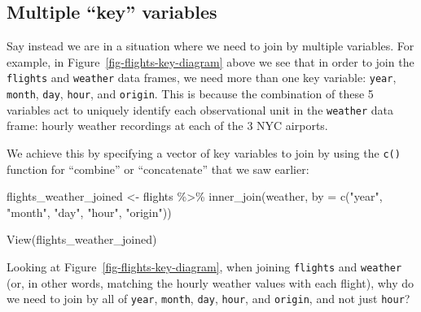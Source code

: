 \documentclass[
  letterpaper,
  DIV=11,
  numbers=noendperiod]{scrreprt}
\newenvironment{Shaded}{\begin{snugshade}}{\end{snugshade}}
\newcommand{\AttributeTok}[1]{\textcolor[rgb]{0.40,0.45,0.13}{#1}}
\newcommand{\FunctionTok}[1]{\textcolor[rgb]{0.28,0.35,0.67}{#1}}
\newcommand{\NormalTok}[1]{\textcolor[rgb]{0.00,0.23,0.31}{#1}}
\newcommand{\OtherTok}[1]{\textcolor[rgb]{0.00,0.23,0.31}{#1}}
\newcommand{\SpecialCharTok}[1]{\textcolor[rgb]{0.37,0.37,0.37}{#1}}
\newcommand{\StringTok}[1]{\textcolor[rgb]{0.13,0.47,0.30}{#1}}
\theoremstyle{definition}
\theoremstyle{remark}
\begin{document}
\hypertarget{multiple-key-variables}{%
\subsection{Multiple ``key'' variables}\label{multiple-key-variables}}

Say instead we are in a situation where we need to join by multiple
variables. For example, in Figure~\ref{fig-flights-key-diagram} above we
see that in order to join the \texttt{flights} and \texttt{weather} data
frames, we need more than one key variable: \texttt{year},
\texttt{month}, \texttt{day}, \texttt{hour}, and \texttt{origin}. This
is because the combination of these 5 variables act to uniquely identify
each observational unit in the \texttt{weather} data frame: hourly
weather recordings at each of the 3 NYC airports.

We achieve this by specifying a vector of key variables to join by using
the \texttt{c()} function for ``combine'' or ``concatenate'' that we saw
earlier:

\begin{Shaded}
\begin{Highlighting}[]
\NormalTok{flights\_weather\_joined }\OtherTok{\textless{}{-}}\NormalTok{ flights }\SpecialCharTok{\%\textgreater{}\%}
  \FunctionTok{inner\_join}\NormalTok{(weather, }\AttributeTok{by =} \FunctionTok{c}\NormalTok{(}\StringTok{"year"}\NormalTok{, }\StringTok{"month"}\NormalTok{, }\StringTok{"day"}\NormalTok{, }\StringTok{"hour"}\NormalTok{, }\StringTok{"origin"}\NormalTok{))}

\FunctionTok{View}\NormalTok{(flights\_weather\_joined)}
\end{Highlighting}
\end{Shaded}

\begin{tcolorbox}[enhanced jigsaw, colback=white, toprule=.15mm, bottomrule=.15mm, titlerule=0mm, title={{🎯} Learning Check 3.13}, leftrule=.75mm, arc=.35mm, left=2mm, colframe=quarto-callout-tip-color-frame, coltitle=black, opacitybacktitle=0.6, bottomtitle=1mm, colbacktitle=quarto-callout-tip-color!10!white, opacityback=0, toptitle=1mm, rightrule=.15mm, breakable]

Looking at Figure~\ref{fig-flights-key-diagram}, when joining
\texttt{flights} and \texttt{weather} (or, in other words, matching the
hourly weather values with each flight), why do we need to join by all
of \texttt{year}, \texttt{month}, \texttt{day}, \texttt{hour}, and
\texttt{origin}, and not just \texttt{hour}?

\end{tcolorbox}
\end{document}
